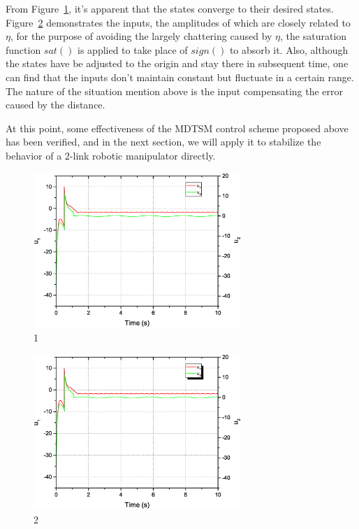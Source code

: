 \documentclass[3p]{elsarticle}
\theoremstyle{plain}
\theoremstyle{remark}
\begin{document}
From Figure~\ref{Figure:2}, it's apparent that the states converge to their desired states. Figure~\ref{Figure:3} demonstrates the inputs, the amplitudes of which are closely related to $\eta$, for the purpose of avoiding the largely chattering caused by $\eta$, the saturation function $sat()$ is applied to take place of $sign()$ to absorb it. Also, although the states have be adjusted to the origin and stay there in subsequent time, one can find that the inputs don't maintain constant but fluctuate in a certain range. The nature of the situation mention above is the input compensating the error caused by the distance.\par
At this point, some effectiveness of the MDTSM control scheme proposed above has been verified, and in the next section, we will apply it to stabilize the behavior of a $2$-link robotic manipulator directly.
\begin{figure}
\centering
\includegraphics[width=0.7\textwidth]{paper3_fig2.eps}
\caption{1}
\label{Figure:2}
\end{figure}

\begin{figure}
\centering
\includegraphics[width=0.7\textwidth]{paper3_fig3.eps}
\caption{2}
\label{Figure:3}
\end{figure}
\end{document}
